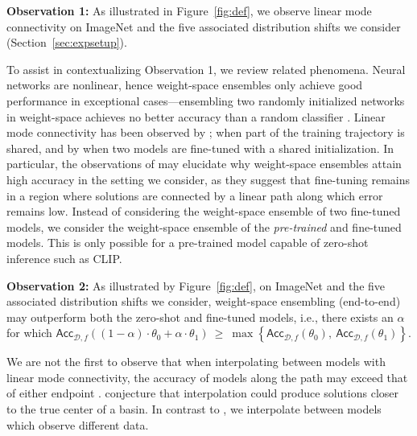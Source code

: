 \textbf{Observation 1:} As illustrated in Figure~\ref{fig:def}, we observe linear mode connectivity on ImageNet and the five associated distribution shifts we consider (Section~\ref{sec:expsetup}).

To assist in contextualizing Observation 1, we review related phenomena. Neural networks are nonlinear, hence weight-space ensembles only achieve good performance in exceptional cases---ensembling two randomly initialized networks in weight-space achieves no better accuracy than a random classifier \cite{frankle2020linear}. 
Linear mode connectivity has been observed by 
\citet{frankle2020linear}; \citet{izmailov2018averaging}  when part of the training trajectory is shared, and by \citet{neyshabur2020being} when two models are fine-tuned with a shared initialization.
In particular, the observations of \citet{neyshabur2020being} may elucidate why weight-space ensembles attain high 
accuracy in the setting we consider, as they suggest that fine-tuning remains in a region where solutions are connected by a linear path along which error remains low.
Instead of considering the weight-space ensemble of two fine-tuned models, we consider the weight-space ensemble of the 
\textit{pre-trained} and fine-tuned models. This is only possible for a pre-trained model capable of zero-shot inference such as CLIP. 


\textbf{Observation 2:} As illustrated by Figure~\ref{fig:def}, on ImageNet and the five associated distribution shifts we consider, weight-space ensembling (end-to-end) may outperform both the zero-shot and fine-tuned models, i.e., there exists an $\alpha$ for which $\mathsf{Acc}_{\mathcal{D}, f}\left((1-\alpha) \cdot \theta_0 +  \alpha \cdot \theta_1\right) \ \geq \ \max\left\{  \mathsf{Acc}_{\mathcal{D}, f}\left(\theta_0\right) ,  \ \mathsf{Acc}_{\mathcal{D}, f}\left(\theta_1\right) \right\}$.

We are not the first to observe that when interpolating between models with linear mode connectivity, the accuracy of models along the path may exceed that of either endpoint \cite{izmailov2018averaging, neyshabur2020being, pmlr-v139-wortsman21a}. \citet{neyshabur2020being}
conjecture that interpolation could produce solutions closer to the true center of a basin. 
In contrast to \citet{neyshabur2020being}, we interpolate between models which observe different data.










